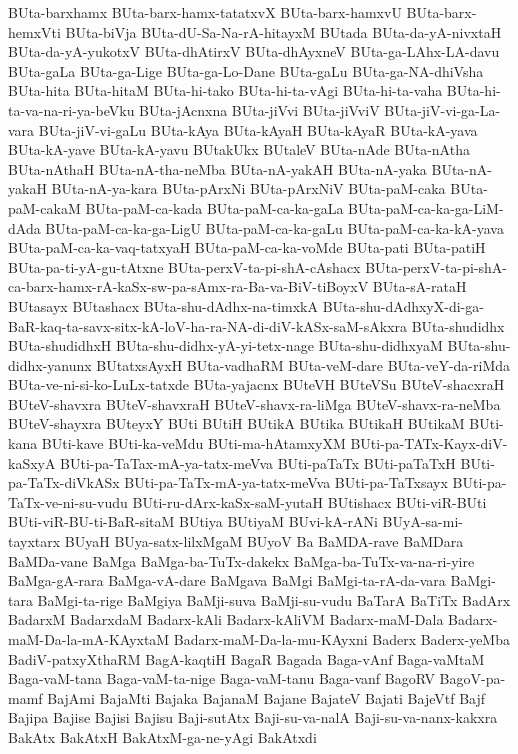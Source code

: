 {BUta-barxhamx
BUta-barx-hamx-tatatxvX
BUta-barx-hamxvU
BUta-barx-hemxVti
BUta-biVja
BUta-dU-Sa-Na-rA-hitayxM
BUtada
BUta-da-yA-nivxtaH
BUta-da-yA-yukotxV
BUta-dhAtirxV
BUta-dhAyxneV
BUta-ga-LAhx-LA-davu
BUta-gaLa
BUta-ga-Lige
BUta-ga-Lo-Dane
BUta-gaLu
BUta-ga-NA-dhiVsha
BUta-hita
BUta-hitaM
BUta-hi-tako
BUta-hi-ta-vAgi
BUta-hi-ta-vaha
BUta-hi-ta-va-na-ri-ya-beVku
BUta-jAcnxna
BUta-jiVvi
BUta-jiVviV
BUta-jiV-vi-ga-La-vara
BUta-jiV-vi-gaLu
BUta-kAya
BUta-kAyaH
BUta-kAyaR
BUta-kA-yava
BUta-kA-yave
BUta-kA-yavu
BUtakUkx
BUtaleV
BUta-nAde
BUta-nAtha
BUta-nAthaH
BUta-nA-tha-neMba
BUta-nA-yakAH
BUta-nA-yaka
BUta-nA-yakaH
BUta-nA-ya-kara
BUta-pArxNi
BUta-pArxNiV
BUta-paM-caka
BUta-paM-cakaM
BUta-paM-ca-kada
BUta-paM-ca-ka-gaLa
BUta-paM-ca-ka-ga-LiM-dAda
BUta-paM-ca-ka-ga-LigU
BUta-paM-ca-ka-gaLu
BUta-paM-ca-ka-kA-yava
BUta-paM-ca-ka-vaq-tatxyaH
BUta-paM-ca-ka-voMde
BUta-pati
BUta-patiH
BUta-pa-ti-yA-gu-tAtxne
BUta-perxV-ta-pi-shA-cAshacx
BUta-perxV-ta-pi-shA-ca-barx-hamx-rA-kaSx-sw-pa-sAmx-ra-Ba-va-BiV-tiBoyxV
BUta-sA-rataH
BUtasayx
BUtashacx
BUta-shu-dAdhx-na-timxkA
BUta-shu-dAdhxyX-di-ga-BaR-kaq-ta-savx-sitx-kA-loV-ha-ra-NA-di-diV-kASx-saM-sAkxra
BUta-shudidhx
BUta-shudidhxH
BUta-shu-didhx-yA-yi-tetx-nage
BUta-shu-didhxyaM
BUta-shu-didhx-yanunx
BUtatxsAyxH
BUta-vadhaRM
BUta-veM-dare
BUta-veY-da-riMda
BUta-ve-ni-si-ko-LuLx-tatxde
BUta-yajacnx
BUteVH
BUteVSu
BUteV-shacxraH
BUteV-shavxra
BUteV-shavxraH
BUteV-shavx-ra-liMga
BUteV-shavx-ra-neMba
BUteV-shayxra
BUteyxY
BUti
BUtiH
BUtikA
BUtika
BUtikaH
BUtikaM
BUti-kana
BUti-kave
BUti-ka-veMdu
BUti-ma-hAtamxyXM
BUti-pa-TATx-Kayx-diV-kaSxyA
BUti-pa-TaTax-mA-ya-tatx-meVva
BUti-paTaTx
BUti-paTaTxH
BUti-pa-TaTx-diVkASx
BUti-pa-TaTx-mA-ya-tatx-meVva
BUti-pa-TaTxsayx
BUti-pa-TaTx-ve-ni-su-vudu
BUti-ru-dArx-kaSx-saM-yutaH
BUtishacx
BUti-viR-BUti
BUti-viR-BU-ti-BaR-sitaM
BUtiya
BUtiyaM
BUvi-kA-rANi
BUyA-sa-mi-tayxtarx
BUyaH
BUya-satx-lilxMgaM
BUyoV
Ba
BaMDA-rave
BaMDara
BaMDa-vane
BaMga
BaMga-ba-TuTx-dakekx
BaMga-ba-TuTx-va-na-ri-yire
BaMga-gA-rara
BaMga-vA-dare
BaMgava
BaMgi
BaMgi-ta-rA-da-vara
BaMgi-tara
BaMgi-ta-rige
BaMgiya
BaMji-suva
BaMji-su-vudu
BaTarA
BaTiTx
BadArx
BadarxM
BadarxdaM
Badarx-kAli
Badarx-kAliVM
Badarx-maM-Dala
Badarx-maM-Da-la-mA-KAyxtaM
Badarx-maM-Da-la-mu-KAyxni
Baderx
Baderx-yeMba
BadiV-patxyXthaRM
BagA-kaqtiH
BagaR
Bagada
Baga-vAnf
Baga-vaMtaM
Baga-vaM-tana
Baga-vaM-ta-nige
Baga-vaM-tanu
Baga-vanf
BagoRV
BagoV-pa-mamf
BajAmi
BajaMti
Bajaka
BajanaM
Bajane
BajateV
Bajati
BajeVtf
Bajf
Bajipa
Bajise
Bajisi
Bajisu
Baji-sutAtx
Baji-su-va-nalA
Baji-su-va-nanx-kakxra
BakAtx
BakAtxH
BakAtxM-ga-ne-yAgi
BakAtxdi
}
